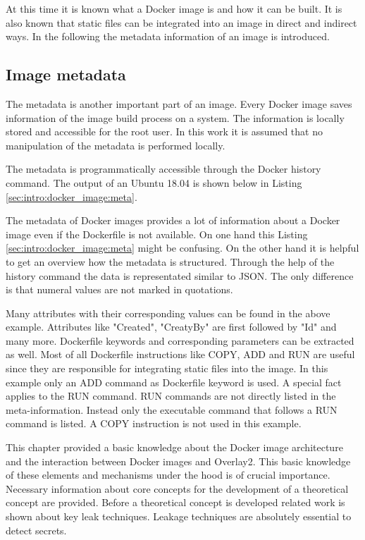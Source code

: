 At this time it is known what a Docker image is and how it can be built. 
It is also known that static files can be integrated into an image in direct and indirect ways. 
In the following the metadata information of an image is introduced.

\subsection{Image metadata}
\label{sec:intro:docker_image:docker_img:meta}
The metadata is another important part of an image. 
Every Docker image saves information of the image build process on a system.  
The information is locally stored and accessible for the root user. 
In this work it is assumed that no manipulation of the metadata is performed locally. 

The metadata is programmatically accessible through the Docker history command. 
The output of an Ubuntu 18.04 is shown below in Listing \ref{sec:intro:docker_image:meta}.

The metadata of Docker images provides a lot of information about a Docker image even if the Dockerfile is not available. 
On one hand this Listing \ref{sec:intro:docker_image:meta} might be confusing. 
On the other hand it is helpful to get an overview how the metadata is structured. 
Through the help of the history command the data is representated similar to JSON. 
The only difference is that numeral values are not marked in quotations. 

Many attributes with their corresponding values can be found in the above example. 
Attributes like "Created", "CreatyBy" are first followed by "Id" and many more. 	
Dockerfile keywords and corresponding parameters can be extracted as well.
Most of all Dockerfile instructions like COPY, ADD and RUN are useful since they are responsible for integrating static files into the image.
In this example only an ADD command as Dockerfile keyword is used.
A special fact applies to the RUN command. 
RUN commands are not directly listed in the meta-information.
Instead only the executable command that follows a RUN command is listed.
A COPY instruction is not used in this example.

This chapter provided a basic knowledge about the Docker image architecture and the interaction between Docker images and Overlay2. 
This basic knowledge of these elements and mechanisms under the hood is of crucial importance. 
Necessary information about core concepts for the development of a theoretical concept are provided.
Before a theoretical concept is developed related work is shown about key leak techniques.
Leakage techniques are absolutely essential to detect secrets.